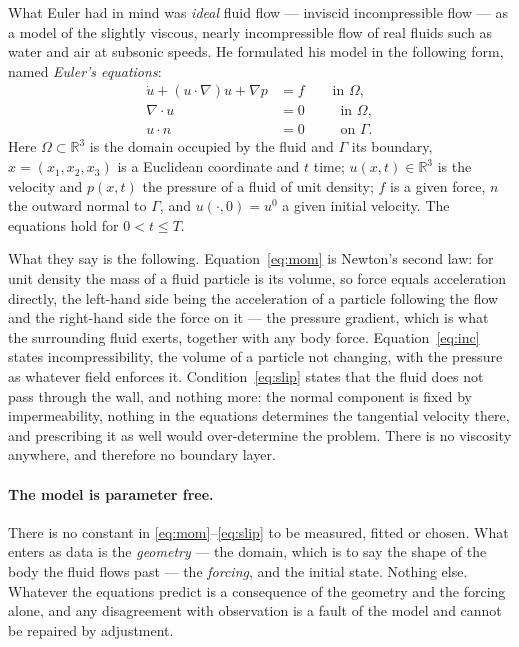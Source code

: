 \documentclass[11pt]{article}
\newcommand{\grad}{\nabla}
\begin{document}
\noindent What Euler had in mind was \emph{ideal} fluid flow --- inviscid incompressible flow --- as
a model of the slightly viscous, nearly incompressible flow of real fluids such as water and air at
subsonic speeds. He formulated his model in the following form, named \emph{Euler's equations}:
\begin{align}
\dot u + (u\cdot\grad)u + \grad p &= f \qquad\text{in }\Omega, \label{eq:mom}\\[2pt]
\grad\cdot u &= 0 \qquad\;\;\text{in }\Omega, \label{eq:inc}\\[2pt]
u\cdot n &= 0 \qquad\;\;\text{on }\Gamma . \label{eq:slip}
\end{align}
Here $\Omega\subset\mathbb{R}^3$ is the domain occupied by the fluid and $\Gamma$ its boundary,
$x=(x_1,x_2,x_3)$ is a Euclidean coordinate and $t$ time; $u(x,t)\in\mathbb{R}^3$ is the velocity and
$p(x,t)$ the pressure of a fluid of unit density; $f$ is a given force, $n$ the outward normal to
$\Gamma$, and $u(\cdot,0)=u^0$ a given initial velocity. The equations hold for $0<t\le T$.

What they say is the following. Equation~\eqref{eq:mom} is Newton's second law: for unit density the
mass of a fluid particle is its volume, so force equals acceleration directly, the left-hand side
being the acceleration of a particle following the flow and the right-hand side the force on it ---
the pressure gradient, which is what the surrounding fluid exerts, together with any body force.
Equation~\eqref{eq:inc} states incompressibility, the volume of a particle not changing, with the
pressure as whatever field enforces it. Condition~\eqref{eq:slip} states that the fluid does not pass
through the wall, and nothing more: the normal component is fixed by impermeability, nothing in the
equations determines the tangential velocity there, and prescribing it as well would over-determine
the problem. There is no viscosity anywhere, and therefore no boundary layer.

\paragraph{The model is parameter free.} There is no constant in
\eqref{eq:mom}--\eqref{eq:slip} to be measured, fitted or chosen. What enters as data is the
\emph{geometry} --- the domain, which is to say the shape of the body the fluid flows past --- the
\emph{forcing}, and the initial state. Nothing else. Whatever the equations predict is a consequence
of the geometry and the forcing alone, and any disagreement with observation is a fault of the model
and cannot be repaired by adjustment.
\end{document}

